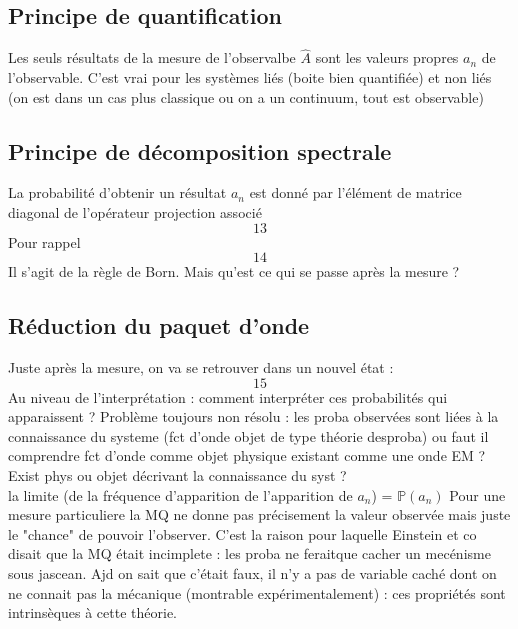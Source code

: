  \subsection{Principe de quantification}
 Les seuls résultats de la mesure de l'observalbe $\hat{A}$ sont les 
 valeurs propres $a_n$ de l'observable. C'est vrai pour les systèmes liés 
 (boite bien quantifiée) et non liés (on est dans un cas plus classique ou 
 on a un continuum, tout est observable)
 
 \subsection{Principe de décomposition spectrale}
 La probabilité d'obtenir un résultat $a_n$ est donné par l'élément de 
 matrice diagonal de l'opérateur projection associé
 \begin{equation}
 13
 \end{equation}
 Pour rappel
 \begin{equation}
 14
 \end{equation}
 Il s'agit de la règle de Born. Mais qu'est ce qui se passe après la 
 mesure ?
 
 \subsection{Réduction du paquet d'onde}
 Juste après la mesure, on va se retrouver dans un nouvel état :
 \begin{equation}
 15
 \end{equation}
 Au niveau de l'interprétation : comment interpréter ces probabilités 
 qui apparaissent ? Problème toujours non résolu : les proba observées 
 sont liées à la connaissance du systeme (fct d'onde objet de type 
 théorie desproba) ou faut il comprendre fct d'onde comme objet 
 physique existant comme une onde EM ? Exist phys ou objet décrivant 
 la connaissance du syst ? \\
 
 la limite (de la fréquence d'apparition de l'apparition de $a_n$) =
 $\mathbb{P}(a_n)$ Pour une mesure particuliere la MQ ne donne pas précisement 
 la valeur observée mais juste le "chance" de pouvoir l'observer. C'est 
 la raison pour laquelle Einstein et co disait que la MQ était incimplete  : 
 les proba ne feraitque cacher un mecénisme sous jascean. Ajd on sait que 
 c'était faux, il n'y a pas de variable caché dont on ne connait pas la 
 mécanique (montrable expérimentalement) : ces propriétés sont intrinsèques 
 à cette théorie.\\
 
